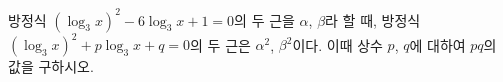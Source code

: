 방정식 $(\log_3 x)^2-6\log_3 x+1=0$의 두 근을 $\alpha$, $\beta$라 할 때, 방정식 $(\log_3 x)^2+p\log_3 x+q=0$의 두 근은 $\alpha^2$, $\beta^2$이다. 이때 상수 $p$, $q$에 대하여 $pq$의 값을 구하시오.
